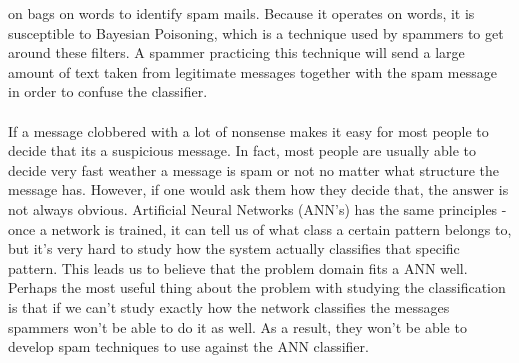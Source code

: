 on bags on words to identify spam mails. Because it operates on words, it is
susceptible to Bayesian Poisoning, which is a technique used by spammers to get
around these filters. A spammer practicing this technique will send a large
amount of text taken from legitimate messages together with the spam message in
order to confuse the classifier.  \\\\ If a message clobbered with a lot of
nonsense makes it easy for most people to decide that its a suspicious message.
In fact, most people are usually able to decide very fast weather a message is
spam or not no matter what structure the message has. However, if one would ask
them how they decide that, the answer is not always obvious.  Artificial Neural Networks (ANN's) has the
same principles - once a network is trained, it can tell us of what class a
certain pattern belongs to, but it's very hard to study how the system actually
classifies that specific pattern. This leads us to believe that the problem
domain fits a ANN well. Perhaps the most useful thing about the problem with studying the classification is
that if we can't study exactly how the network classifies the messages
spammers won't be able to do it as well. As a result, they won't be able to develop spam
techniques to use against the ANN classifier.
